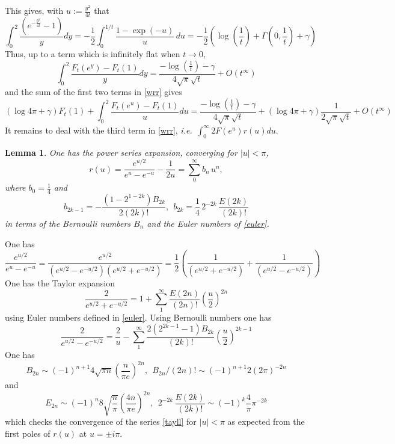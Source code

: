 \documentclass[reqno,12pt]{amsart}
\newtheorem{lem}[thm]{Lemma}
\newcommand{\ie}{{\it i.e.\/}\ }
\begin{document}
 This gives, with $u:= \frac{y^2}{4 t}$ that 
 $$
 \int_0^2 \frac{(e^{-\frac{y^2}{4 t}}-1)}{y}dy=-\frac 12\int_0^{1/t}\frac{1-\exp (-u)}{u} \, du=-\frac 12\left(\log (\frac{1}{ t})+\Gamma (0,\frac{1}{ t})+\gamma \right) 
 $$
 Thus, up to a term which is infinitely flat when $t\to 0$,
 \begin{equation}\label{as2}
\int_0^2 \frac{F_t(e^y)-F_t(1)}{y}dy=\frac{-\log \left(\frac{1}{ t}\right)-\gamma }{4 \sqrt{\pi } \sqrt{t}}+O(t^\infty)
 \end{equation}
 and the sum of the first two terms in \eqref{wrr} gives 
  \begin{equation}\label{as3}
(\log 4\pi +\gamma)F_t(1)+\int_0^2 \frac{F_t(e^u)-F_t(1)}{u}du=\frac{-\log \left(\frac{1}{ t}\right)-\gamma }{4 \sqrt{\pi } \sqrt{t}}+(\log 4\pi +\gamma)\frac{1}{2\sqrt{ \pi } \sqrt{t}}+O(t^\infty)
 \end{equation}
 It remains to deal with the third term in \eqref{wrr}, \ie $\int_{0}^\infty 2F(e^u)r(u)du$.  
 \begin{lem} One has the power series expansion,  converging for $\vert u\vert<\pi$,  \begin{equation}\label{tayll} 
 r(u)= \frac{e^{u/2}}{e^u-e^{-u}}-\frac {1}{2u}=\sum_0^\infty  b_n\, u^n,  
   \end{equation}
  where $b_0=\frac 14$ and $$b_{2k-1}=
  -\frac{ \left(1-2^{1-2k}\right) B_{2 k}}{2(2 k)!},
 \  \
  b_{2k}=\frac 14 \, 2^{-2k}\,\frac{E(2k)}{(2k)!}
  $$
 	in terms of the Bernoulli numbers $B_n$ and the Euler numbers of \eqref{euler}.
 \end{lem}
\proof  
 One has 
 $$
 \frac{e^{u/2}}{e^u-e^{-u}}=\frac{e^{u/2}}{(e^{u/2}-e^{-u/2})(e^{u/2}+e^{-u/2})}=\frac 12\left(\frac{1}{(e^{u/2}+e^{-u/2})} +\frac{1}{(e^{u/2}-e^{-u/2})} \right)
 $$
One has the Taylor expansion
$$
\frac{2}{e^{u/2}+e^{-u/2}}=1+\sum_1^\infty \frac{E(2n)}{(2n)!}\left(\frac u2\right)^{2n}
$$
 using Euler numbers defined in \eqref{euler}. 
Using Bernoulli numbers one has 
$$
\frac{2}{e^{u/2}-e^{-u/2}}=\frac 2u -\sum_1^\infty\frac{2 \left(2^{2 k-1}-1\right) B_{2 k}}{(2 k)!}\left(\frac u2\right)^{2k-1}
$$ 
One has 
$$
 B_{2 n} \sim(-1)^{n+1} 4 \sqrt{\pi n}\left(\frac{n}{\pi e}\right)^{2 n}, \ \ 
 B_{2 n}/(2n)!\sim (-1)^{n+1}  2\left(2\pi\right)^{-2n}
 $$
 and
 $$
 E_{2 n} \sim(-1)^n 8 \sqrt{\frac{n}{\pi}}\left(\frac{4 n}{\pi e}\right)^{2 n}, \  \ 2^{-2k}\,\frac{E(2k)}{(2k)!}\sim (-1)^k \frac 4 \pi \pi^{-2k}
 $$
 which checks the convergence of the series \eqref{tayll} for $\vert u\vert<\pi$  as expected from the first poles of $r(u)$ at $u=\pm i\pi$.\endproof 
\end{document}
